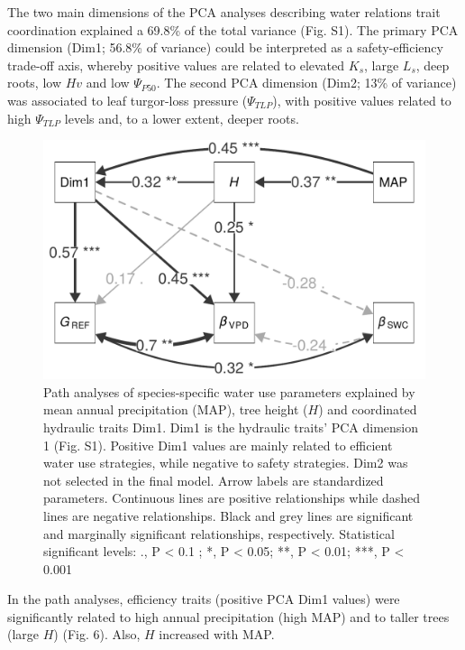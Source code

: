 \documentclass[11pt,twoside]{reedthesis}
\begin{document}
The two main dimensions of the PCA analyses describing water relations
trait coordination explained a 69.8\% of the total variance (Fig. S1).
The primary PCA dimension (Dim1; 56.8\% of variance) could be
interpreted as a safety-efficiency trade-off axis, whereby positive
values are related to elevated \(K_s\), large \(L_s\), deep roots, low
\(Hv\) and low \textbar{}\(\Psi_{P50}\)\textbar{}. The second PCA
dimension (Dim2; 13\% of variance) was associated to leaf turgor-loss
pressure (\(\Psi_{TLP}\)), with positive values related to high
\textbar{}\(\Psi_{TLP}\)\textbar{} levels and, to a lower extent, deeper
roots.\par
\begin{figure}[hbt!]

{\centering \includegraphics[width=0.8\linewidth]{figure/CH5/Figure_6} 

}

\caption[Path analyses of species-specific water use parameters.]{Path analyses of species-specific water use parameters explained by mean annual precipitation (MAP), tree height ($H$) and coordinated hydraulic traits Dim1. Dim1 is the hydraulic traits’ PCA dimension 1 (Fig. S1). Positive Dim1 values are mainly related to efficient water use strategies, while negative to safety strategies. Dim2 was not selected in the final model. Arrow labels are standardized parameters. Continuous lines are positive relationships while dashed lines are negative relationships. Black and grey lines are significant and marginally significant relationships, respectively. Statistical significant levels: ., P < 0.1 ; *, P < 0.05; **, P < 0.01; ***, P < 0.001}\label{fig:ch5fig6}
\end{figure}
In the path analyses, efficiency traits (positive PCA Dim1 values) were
significantly related to high annual precipitation (high MAP) and to
taller trees (large \(H\)) (Fig. 6). Also, \(H\) increased with MAP.
\end{document}
